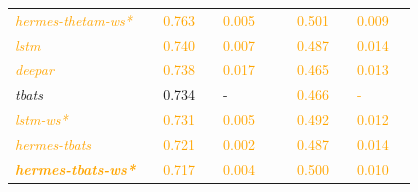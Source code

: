 \documentclass[10pt]{article} %
\begin{document}
\begin{table}
{\begin{tabular}{l||lllll|lllll}
     \textcolor{orange}{\textit{hermes-thetam-ws*}} && \textcolor{orange}{0.763} && \textcolor{orange}{0.005} &&& \textcolor{orange}{0.501} && \textcolor{orange}{0.009} &\\
     \textcolor{orange}{\textit{lstm}} && \textcolor{orange}{0.740} && \textcolor{orange}{0.007} &&& \textcolor{orange}{0.487} && \textcolor{orange}{0.014} &\\
     \textcolor{orange}{\textit{deepar}} && \textcolor{orange}{0.738} && \textcolor{orange}{0.017} &&& \textcolor{orange}{0.465} && \textcolor{orange}{0.013} &\\
     \textit{tbats} && 0.734 && - &&& \textcolor{orange}{0.466} && \textcolor{orange}{-} &\\
     \textcolor{orange}{\textit{lstm-ws*}} && \textcolor{orange}{0.731} && \textcolor{orange}{0.005} &&& \textcolor{orange}{0.492} && \textcolor{orange}{0.012} &\\
     \textcolor{orange}{\textit{hermes-tbats}} && \textcolor{orange}{0.721} && \textcolor{orange}{0.002} &&& \textcolor{orange}{0.487} && \textcolor{orange}{0.014} &\\
     \textcolor{orange}{\textbf{\textit{hermes-tbats-ws*}}} && \textcolor{orange}{0.717} && \textcolor{orange}{0.004} &&& \textcolor{orange}{0.500} && \textcolor{orange}{0.010} &\\
     
  \end{tabular}\hspace{1cm}
\vspace{.2cm}

}
\end{table}
\end{document}
